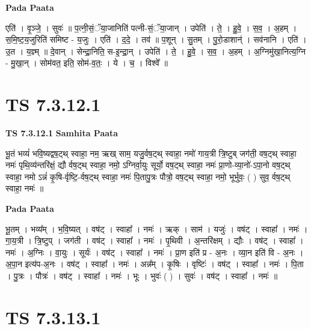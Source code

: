 \documentclass[17pt]{extarticle}
\begin{document}
\textbf{Pada Paata} \newline

एति॑ । वृ॒ञ्जे॒ । सुवः॑ ॥ प॒त्नी॒सं॒ॅया॒जानिति॑ पत्नी-सं॒ॅया॒जान् । उपेति॑ । ते॒ । हु॒वे॒ । स॒व॒ । अ॒हम् । स॒मि॒ष्ट॒य॒जुरिति॑ समिष्ट - य॒जुः । एति॑ । द॒दे॒ । तव॑ ॥ प॒शून् । सु॒तम् । पु॒रो॒डाशान्॑ । सव॑नानि । एति॑ । उ॒त । य॒ज्ञ्म् ॥ दे॒वान् । सेन्द्रा॒निति॒ स-इ॒न्द्रा॒न् । उपेति॑ । ते॒ । हु॒वे॒ । स॒व॒ । अ॒हम् । अ॒ग्निमु॑खा॒नित्य॒ग्नि - मु॒खा॒न् । सोम॑वत॒ इति॒ सोम॑-व॒तः॒ । ये । च॒ । विश्वे᳚ ॥  \newline





\section{ TS 7.3.12.1 }

\textbf{TS 7.3.12.1 } \newline
\textbf{Samhita Paata} \newline

भू॒तं भव्यं॑ भवि॒ष्यद्वष॒ट्थ् स्वाहा॒ नम॒ ऋख् साम॒ यजु॒र्वष॒ट्थ् स्वाहा॒ नमो॑ गाय॒त्री त्रि॒ष्टुब् जग॑ती॒ वष॒ट्थ् स्वाहा॒ नमः॑ पृथि॒व्य॑न्तरि॑क्षं॒ द्यौ र्वष॒ट्थ् स्वाहा॒ नमो॒ ऽग्निर्वा॒युः सूर्यो॒ वष॒ट्थ् स्वाहा॒ नमः॑ प्रा॒णो-व्या॒नो॑-ऽपा॒नो वष॒ट्थ् स्वाहा॒ नमो ऽन्नं॑ कृ॒षि-र्वृष्टि॒-र्वष॒ट्थ् स्वाहा॒ नमः॑ पि॒तापु॒त्रः पौत्रो॒ वष॒ट्थ् स्वाहा॒ नमो॒ भूर्भुवः॒ ( ) सुव॒ र्वष॒ट्थ् स्वाहा॒ नमः॑ ॥ \newline

\textbf{Pada Paata} \newline

भू॒तम् । भव्य᳚म् । भ॒वि॒ष्यत् । वष॑ट् । स्वाहा᳚ । नमः॑ । ऋक् । साम॑ । यजुः॑ । वष॑ट् । स्वाहा᳚ । नमः॑ । गा॒य॒त्री । त्रि॒ष्टुप् । जग॑ती । वष॑ट् । स्वाहा᳚ । नमः॑ । पृ॒थिवी । अ॒न्तरि॑क्षम् । द्यौः । वष॑ट् । स्वाहा᳚ । नमः॑ । अ॒ग्निः । वा॒युः । सूर्यः॑ । वष॑ट् । स्वाहा᳚ । नमः॑ । प्रा॒ण इति॑ प्र - अ॒नः । व्या॒न इति॑ वि - अ॒नः । अ॒पा॒न इत्य॑प-अ॒नः । वष॑ट् । स्वाहा᳚ । नमः॑ । अन्न᳚म् । कृ॒षिः । वृष्टिः॑ । वष॑ट् । स्वाहा᳚ । नमः॑ । पि॒ता । पु॒त्रः । पौत्रः॑ । वष॑ट् । स्वाहा᳚ । नमः॑ । भूः । भुवः॑ ( ) । सुवः॑ । वष॑ट् । स्वाहा᳚ । नमः॑ ॥  \newline





\section{ TS 7.3.13.1 }
\end{document}
